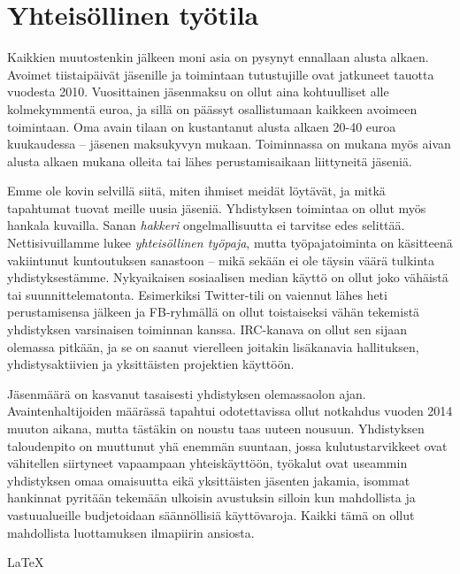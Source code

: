 \documentclass[a4paper]{memoir}
\begin{document}
\section*{Yhteisöllinen työtila}

Kaikkien muutostenkin jälkeen moni asia on pysynyt ennallaan alusta alkaen. Avoimet tiistaipäivät jäsenille ja toimintaan tutustujille ovat jatkuneet tauotta vuodesta 2010. Vuosittainen jäsenmaksu on ollut aina kohtuulliset alle kolmekymmentä euroa, ja sillä on päässyt osallistumaan kaikkeen avoimeen toimintaan. Oma avain tilaan on kustantanut alusta alkaen 20-40 euroa kuukaudessa -- jäsenen maksukyvyn mukaan. Toiminnassa on mukana myös aivan alusta alkaen mukana olleita tai lähes perustamisaikaan liittyneitä jäseniä.

Emme ole kovin selvillä siitä, miten ihmiset meidät löytävät, ja mitkä tapahtumat tuovat meille uusia jäseniä. Yhdistyksen toimintaa on ollut myös hankala kuvailla. Sanan \textit{hakkeri} ongelmallisuutta ei tarvitse edes selittää. Nettisivuillamme lukee \textit{yhteisöllinen työpaja}, mutta työpajatoiminta on käsitteenä vakiintunut kuntoutuksen sanastoon -- mikä sekään ei ole täysin väärä tulkinta yhdistyksestämme. Nykyaikaisen sosiaalisen median käyttö on ollut joko vähäistä tai suunnittelematonta. Esimerkiksi Twitter-tili on vaiennut lähes heti perustamisensa jälkeen ja FB-ryhmällä on ollut toistaiseksi vähän tekemistä yhdistyksen varsinaisen toiminnan kanssa. IRC-kanava on ollut sen sijaan olemassa pitkään, ja se on saanut vierelleen joitakin lisäkanavia hallituksen, yhdistysaktiivien ja yksittäisten projektien käyttöön.

Jäsenmäärä on kasvanut tasaisesti yhdistyksen olemassaolon ajan. Avaintenhaltijoiden määrässä tapahtui odotettavissa ollut notkahdus vuoden 2014 muuton aikana, mutta tästäkin on noustu taas uuteen nousuun. Yhdistyksen taloudenpito on muuttunut yhä enemmän suuntaan, jossa kulutustarvikkeet ovat vähitellen siirtyneet vapaampaan yhteiskäyttöön, työkalut ovat useammin yhdistyksen omaa omaisuutta eikä yksittäisten jäsenten jakamia, isommat hankinnat pyritään tekemään ulkoisin avustuksin silloin kun mahdollista ja vastuualueille budjetoidaan säännöllisiä käyttövaroja. Kaikki tämä on ollut mahdollista luottamuksen ilmapiirin ansiosta.

\vfill

\LaTeX
 
\end{document}
